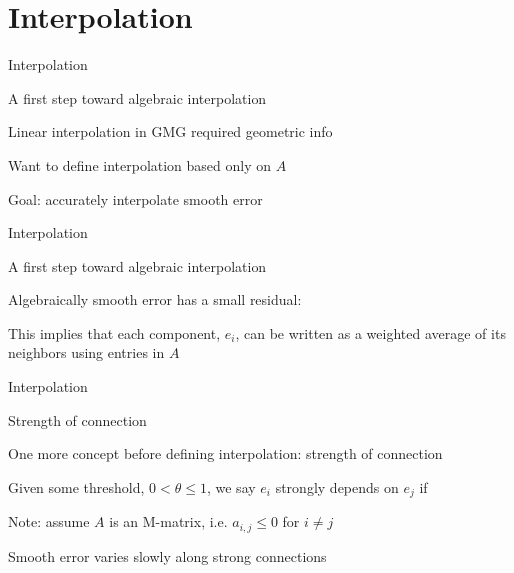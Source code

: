 \documentclass[18pt,xcolor=table]{beamer}
\begin{document}

\section{Interpolation}

\begin{frame}{Interpolation}
\begin{block}{A first step toward algebraic interpolation}
\bit
\item Linear interpolation in GMG required geometric info
\item Want to define interpolation based only on $A$
\item Goal: accurately interpolate smooth error
\eit
\end{block}
\end{frame}

\begin{frame}{Interpolation}
\begin{block}{A first step toward algebraic interpolation}
\bit
\item Algebraically smooth error has a small residual:
\item This implies that each component, $e_i$, can be written as a weighted average of its neighbors using entries in $A$
\eit
\end{block}
\end{frame}

\begin{frame}{Interpolation}
\begin{block}{Strength of connection}
\bit
\item One more concept before defining interpolation: strength of connection
\item Given some threshold, $0 < \theta \leq 1$, we say $e_i$ strongly depends on $e_j$ if
\item Note: assume $A$ is an M-matrix, i.e. $a_{i,j}\leq 0$ for $i\neq j$
\item Smooth error varies slowly along strong connections 
\eit
\end{block}
\end{frame}
\end{document}
